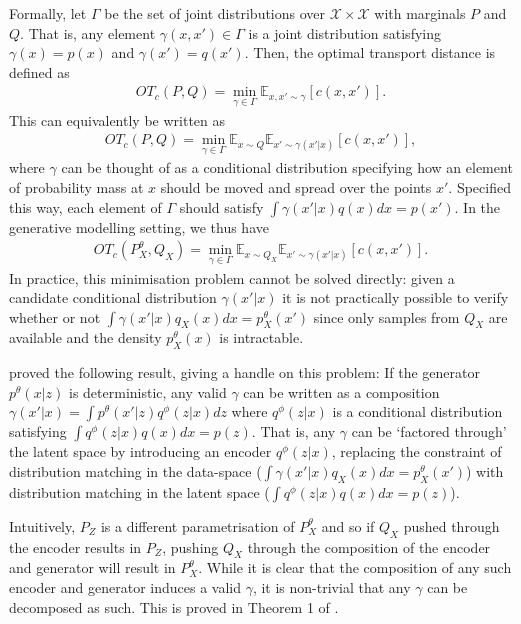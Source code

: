 Formally, let $\Gamma$ be the set of joint distributions over $\mathcal{X} \times \mathcal{X}$ with marginals $P$ and $Q$. 
That is, any element $\gamma(x, x') \in \Gamma$ is a joint distribution satisfying $\gamma(x) = p(x)$ and $\gamma(x') = q(x')$.
Then, the optimal transport distance is defined as
%
\begin{align*}
OT_c(P, Q) = \min_{\gamma \in \Gamma} \mathbb{E}_{x, x' \sim \gamma} \left[ c(x, x') \right].
\end{align*}
%
This can equivalently be written as
%
\begin{align*}
OT_c(P, Q) = \min_{\gamma \in \Gamma} \mathbb{E}_{x\sim Q} \mathbb{E}_{x'\sim \gamma(x'|x)} \left[ c(x, x') \right],
\end{align*}
%
where $\gamma$ can be thought of as a conditional distribution specifying how an element of probability mass at $x$ should be moved and spread over the points $x'$. 
Specified this way, each element of $\Gamma$ should satisfy $\int \gamma(x'|x) q(x) dx = p(x')$.
In the generative modelling setting, we thus have
%
\begin{align*}
OT_c(P_X^\theta, Q_X) = \min_{\gamma \in \Gamma} \mathbb{E}_{x\sim Q_X} \mathbb{E}_{x'\sim \gamma(x'|x)} \left[ c(x, x') \right].
\end{align*}
%
In practice, this minimisation problem cannot be solved directly: given a candidate conditional distribution $\gamma(x'|x)$ it is not practically possible to verify whether or not $\int \gamma(x'|x) q_X(x) dx = p_X^\theta(x')$ since only samples from $Q_X$ are available and the density $p^\theta_X(x)$ is intractable.

\cite{tolstikhin2017wasserstein} proved the following result, giving a handle on this problem:
If the generator $p^\theta(x|z)$ is deterministic, any valid $\gamma$ can be written as a composition $\gamma(x'|x) = \int p^\theta(x'|z) q^\phi(z|x) dz$ where $q^\phi(z|x)$ is a conditional distribution satisfying $\int q^\phi(z|x) q(x) dx = p(z)$. 
That is, any $\gamma$ can be `factored through' the latent space by introducing an encoder $q^\phi(z|x)$, replacing the constraint of distribution matching in the data-space ($\int \gamma(x'|x) q_X(x) dx = p_X^\theta(x')$) with distribution matching in the latent space ($\int q^\phi(z|x) q(x) dx = p(z)$).

Intuitively, $P_Z$ is a different parametrisation of $P_X^\theta$ and so if $Q_X$ pushed through the encoder results in $P_Z$, pushing $Q_X$ through the composition of the encoder and generator will result in $P_X^\theta$. 
While it is clear that the composition of any such encoder and generator induces a valid $\gamma$, it is non-trivial that any $\gamma$ can be decomposed as such. 
This is proved in Theorem 1 of \cite{tolstikhin2017wasserstein}.

